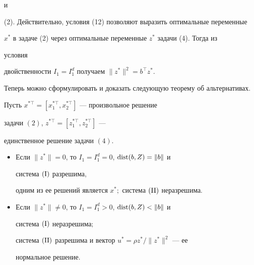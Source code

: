и


(2). Действительно, условия (12) позволяют выразить оптимальные переменные


$x^*$ в задаче (2) через оптимальные переменные $z^*$ задачи (4). Тогда из 


условия


двойственности $I_1=I^d_1$ получаем $\|z^*\|^2=b^\top z^*$.





Теперь можно сформулировать и доказать следующую теорему об альтернативах.





\begin{thm}


Пусть $x^{*\top}=[x^{*\top}_1,x^{*\top}_2]$ --- произвольное решение 


задачи $(2)$, $z^{*\top}=[z^{*\top}_1,z^{*\top}_2]$ ---


единственное решение задачи $(4)$.


\begin{itemize}


\item[1.] Если $\|z^*\|=0$, то $I_1=I^d_1=0$, $\operatorname{dist}(b,Z)=\|b\|$ и 


система $(\mathrm I)$ разрешима,


одним из ее решений является $x^*;$ система $(\mathrm{II})$ неразрешима.


\item[2.] Если $\|z^*\|\ne0$, то $I_1=I^d_1>0$, $\operatorname{dist}(b,Z)<\|b\|$ и 


система $(\mathrm I)$ неразрешима$;$


система $(\mathrm{II})$ разрешима и вектор $u^*=\rho z^*/\|z^*\|^2$ --- ее 


нормальное решение.


\end{itemize}


\end{thm}





